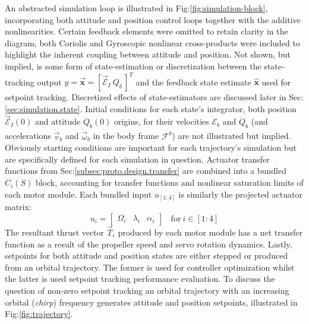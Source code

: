 \par
An abstracted simulation loop is illustrated in Fig:\ref{fig:simulation-block}, incorporating both attitude and position control loops together with the additive nonlinearities. Certain feedback elements were omitted to retain clarity in the diagram, both Coriolis and Gyroscopic nonlinear cross-products were included to highlight the inherent coupling between attitude and position. Not shown, but implied, is some form of state-estimation or discretization between the state-tracking output $y=\vec{\mathbf{x}}=[\vec{\mathcal{E}}_I~Q_b\hspace{2pt}]^T$ and the feedback state estimate $\hat{\mathbf{x}}$ used for setpoint tracking. Discretized effects of state-estimators are discussed later in Sec:\ref{sec:simulation.state}. Initial conditions for each state's integrator, both position $\vec{\mathcal{E}}_I(0)$ and attitude $Q_b(0)$ origins, for their velocities $\dot{\mathcal{E}}_b$ and $\dot{Q}_b$ (and accelerations $\dot{\vec{v}}_b$ and $\dot{\vec{\omega}}_b$ in the body frame $\mathcal{F}^b$) are not illustrated but implied. Obviously starting conditions are important for each trajectory's simulation but are specifically defined for each simulation in question. Actuator transfer functions from Sec:\ref{subsec:proto.design.transfer} are combined into a bundled $C_{i}(S)$ block, accounting for transfer functions and nonlinear saturation limits of each motor module. Each bundled input $u_{[1:4]}$ is similarly the projected actuator matrix:
\begin{equation}
u_i = \begin{bmatrix}
\Omega_i & \lambda_i & \alpha_i
\end{bmatrix}~~~~\text{for}~i\in[1:4]
\end{equation}
The resultant thrust vector $\vec{T}_i$ produced by each motor module has a net transfer function as a result of the propeller speed and servo rotation dynamics. Lastly, setpoints for both attitude and position states are either stepped or produced from an orbital trajectory. The former is used for controller optimization whilst the latter is used setpoint tracking performance evaluation. To discuss the question of non-zero setpoint tracking an orbital trajectory with an increasing orbital (\emph{chirp}) frequency generates attitude and position setpoints, illustrated in Fig:\ref{fig:trajectory}.
